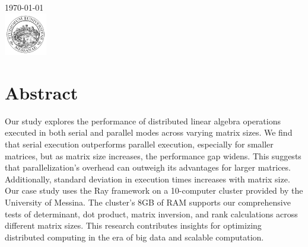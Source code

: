 \begin{titlepage}


    {\large \today}\\[2cm] %


    \includegraphics[width=70px, keepaspectratio]{unime.png}\\[1cm] %


    \vfill %

\end{titlepage}

\tableofcontents
\pagebreak

\section{Abstract}
Our study explores the performance of distributed linear algebra operations executed in both serial and parallel modes across varying matrix sizes. We find that serial execution outperforms parallel execution, especially for smaller matrices, but as matrix size increases, the performance gap widens. This suggests that parallelization's overhead can outweigh its advantages for larger matrices. Additionally, standard deviation in execution times increases with matrix size. Our case study uses the Ray framework on a 10-computer cluster provided by the University of Messina. The cluster's 8GB of RAM supports our comprehensive tests of determinant, dot product, matrix inversion, and rank calculations across different matrix sizes. This research contributes insights for optimizing distributed computing in the era of big data and scalable computation.

